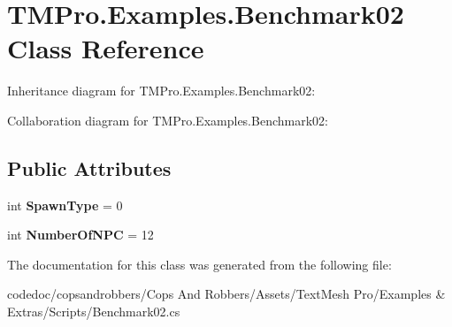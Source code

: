 \hypertarget{classTMPro_1_1Examples_1_1Benchmark02}{}\section{T\+M\+Pro.\+Examples.\+Benchmark02 Class Reference}
\label{classTMPro_1_1Examples_1_1Benchmark02}


Inheritance diagram for T\+M\+Pro.\+Examples.\+Benchmark02\+:


Collaboration diagram for T\+M\+Pro.\+Examples.\+Benchmark02\+:
\subsection*{Public Attributes}
\begin{DoxyCompactItemize}
\item 
\mbox{\label{classTMPro_1_1Examples_1_1Benchmark02_a2a32f6a6d5ecd16e70c8174957234158}} 
int {\bfseries Spawn\+Type} = 0
\item 
\mbox{\label{classTMPro_1_1Examples_1_1Benchmark02_ab564edc57654d2d1a52a5dd012f3b63e}} 
int {\bfseries Number\+Of\+N\+PC} = 12
\end{DoxyCompactItemize}


The documentation for this class was generated from the following file\+:\begin{DoxyCompactItemize}
\item 
codedoc/copsandrobbers/\+Cops And Robbers/\+Assets/\+Text\+Mesh Pro/\+Examples \& Extras/\+Scripts/Benchmark02.\+cs\end{DoxyCompactItemize}
